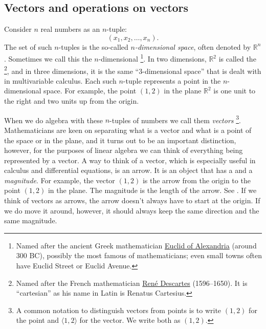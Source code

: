 \documentclass{ximera}
\begin{document}
\subsection{Vectors and operations on vectors}

Consider $n$ real numbers as an $n$-tuple:
\begin{equation*}
(x_1,x_2,\ldots,x_n). 
\end{equation*}
The set of such $n$-tuples is the so-called \emph{$n$-dimensional space}, often denoted by ${\mathbb R}^n$. Sometimes we call this the $n$-dimensional \emph{}%
\footnote{Named after the ancient Greek mathematician \href{https://en.wikipedia.org/wiki/Euclid}{Euclid of Alexandria} (around 300 BC), possibly the most famous of mathematicians; even small towns often have Euclid Street or Euclid Avenue.}. 
In two dimensions, ${\mathbb R}^2$ is called the \emph{}%
\footnote{Named after the French mathematician \href{https://en.wikipedia.org/wiki/Descartes}{Ren\'e Descartes} (1596--1650).  It is ``cartesian'' as his name in Latin is Renatus Cartesius.}, 
and in three dimensions, it is the same ``3-dimensional space'' that is dealt with in multivariable calculus. Each such $n$-tuple represents a point in the $n$-dimensional space. For example, the point $(1,2)$ in the plane ${\mathbb R}^2$ is one unit to the right and two units up from the origin.

When we do algebra with these $n$-tuples of numbers we call them \emph{vectors}%
\footnote{A common notation to distinguish vectors from points is to write $(1,2)$ for the point and $\langle 1,2 \rangle$ for the vector.  We write both as $(1,2)$.}.  
Mathematicians are keen on separating what is a vector and what is a point of the space or in the plane, and it turns out to be an important distinction, however, for the purposes of linear algebra we can think of everything being represented by a vector. A way to think of a vector, which is especially useful in calculus and differential equations, is an arrow.  It is an object that has a \emph{} and a \emph{magnitude}. For example, the vector $(1,2)$ is the arrow from the origin to the point $(1,2)$ in the plane. The magnitude is the length of the arrow. See . If we think of vectors as arrows, the arrow doesn't always have to start at the origin.  If we do move it around, however, it should always keep the same direction and the same magnitude.
\end{document}

